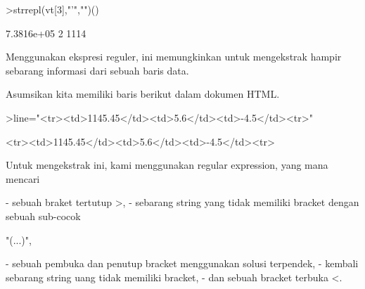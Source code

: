 \documentclass[a4paper,10pt]{article}
\begin{document}
\begin{eulernotebook}
\begin{eulercomment}
\begin{eulercomment}
\begin{eulercomment}
\begin{eulercomment}
\begin{eulercomment}
\begin{eulercomment}
\begin{eulerprompt}
>strrepl(vt[3],"'","")()
\end{eulerprompt}
\begin{euleroutput}
  7.3816e+05
  2
  1114
\end{euleroutput}
\begin{eulercomment}
Menggunakan ekspresi reguler, ini memungkinkan untuk mengekstrak
hampir sebarang informasi dari sebuah baris data.

Asumsikan kita memiliki baris berikut dalam dokumen HTML.
\end{eulercomment}
\begin{eulerprompt}
>line="<tr><td>1145.45</td><td>5.6</td><td>-4.5</td><tr>"
\end{eulerprompt}
\begin{euleroutput}
  <tr><td>1145.45</td><td>5.6</td><td>-4.5</td><tr>
\end{euleroutput}
\begin{eulercomment}
Untuk mengekstrak ini, kami menggunakan regular expression, yang mana
mencari

\end{eulercomment}
\begin{eulerttcomment}
 - sebuah braket tertutup >,
 - sebarang string yang tidak memiliki bracket dengan sebuah sub-cocok
\end{eulerttcomment}
\begin{eulercomment}
"(...)",\\
\end{eulercomment}
\begin{eulerttcomment}
 - sebuah pembuka dan penutup bracket menggunakan solusi terpendek,
 - kembali sebarang string uang tidak memiliki bracket,
 - dan sebuah bracket terbuka <.
\end{eulerttcomment}
\begin{eulercomment}


\end{eulercomment}
\end{eulercomment}
\end{eulercomment}
\end{eulercomment}
\end{eulercomment}
\end{eulercomment}
\end{eulercomment}
\end{eulernotebook}
\end{document}
